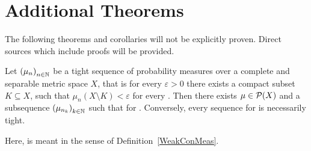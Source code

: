 \chapter*{Additional Theorems}\label{appendix}

\setcounter{theorem}{0}
\renewcommand\thetheorem{A.\arabic{theorem}}

The following theorems and corollaries will not be explicitly proven. Direct sources which include proofs will be provided.




\begin{theorem}\label{Prok}
	Let ${(\mu_n)}_{\NinN}$ be a tight sequence of probability measures over a complete and separable metric space $X$, that is for every $\varepsilon > 0$ there exists a compact subset $K \subseteq X$, such that $\mu_n(X \setminus K) < \varepsilon$ for every \NinN. Then there exists $\mu \in \PM{X}$ and a subsequence ${(\mu_{n_k})}_{\NinN[k]}$ such that  for \Ninf[k]. Conversely, every sequence  for \Ninf{} is necessarily tight.

	Here,  is meant in the sense of Definition~\ref{WeakConMeas}.
\end{theorem}

